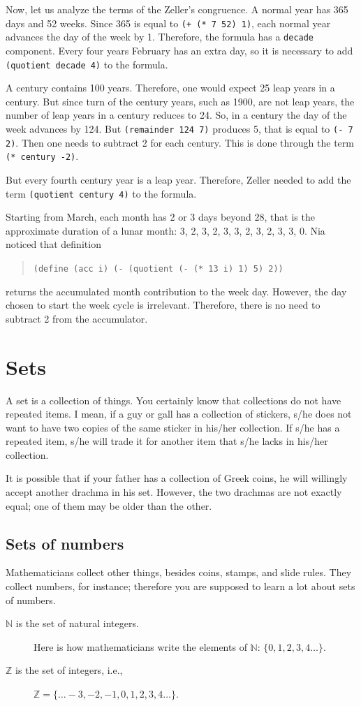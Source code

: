 \documentclass[a4paper,12pt]{book}
\begin{document}
Now, let us analyze the terms of the Zeller's
congruence. A
normal year has 365 days and 52 weeks.
Since 365 is equal to \verb|(+ (* 7 52) 1)|,
each normal year advances the day of the
week by 1. Therefore, the formula has a
\verb|decade| component.
Every four years
February has an extra day,
so it is necessary to add
\verb|(quotient decade 4)|
to the formula.

A century contains 100 years.
Therefore, one would expect  25
leap years in a century. But since
turn of the century years, such as 1900, are
not leap years, the number of leap
years in a century reduces to 24.
So, in a century the day of the
week advances by 124. But
\verb|(remainder 124 7)| produces
5, that is equal to \verb|(- 7 2)|.
Then one needs to subtract 2 for
each century. This is done through
the term \verb|(* century -2)|.

But every fourth century year is
a leap year. Therefore, Zeller needed to 
add the term \verb|(quotient century 4)|
to the formula.

Starting from March, each month
has 2 or 3 days beyond 28, that is
the approximate duration of a lunar
month: 3, 2,
3, 2, 3, 3, 2, 3, 2, 3, 3, 0.
Nia noticed that definition
\begin{quote}
\verb|(define (acc i) (- (quotient (- (* 13 i) 1) 5) 2))|
\end{quote}
returns the accumulated month contribution
to the week day.
However, the day chosen to start
the week cycle is irrelevant. Therefore,
there is no need to subtract 2 from the
accumulator.

\chapter{Sets}
A set is a collection of things. You certainly know that
collections do not have repeated items. I mean, if a guy or gall has
a collection of stickers, s/he does not want to have two
copies of the same sticker in his/her collection. If s/he has a
repeated item, s/he will trade it for another item that s/he lacks
in his/her collection.


It is possible that if your father has a collection of Greek
coins, he will willingly accept another drachma in his set.
However, the two drachmas are not exactly equal; one of them may be older
than the other.

\section{Sets of numbers}
Mathematicians collect other things, besides
coins, stamps, and slide rules. They collect numbers, for instance;
therefore you are supposed to learn a lot about sets of numbers.
\begin{description}
\item[$\mathbb{N}$ is the set of natural integers.] Here is how mathematicians  write the
elements of $\mathbb{N}$: $\{0,1,2,3,4\ldots\}$.
\item[$\mathbb{Z}$ is the set of integers, i.e.,] $\mathbb{Z}=\{\ldots-3, -2, -1, 0, 1, 2, 3, 4\ldots\}$.
\end{description}
\end{document}
